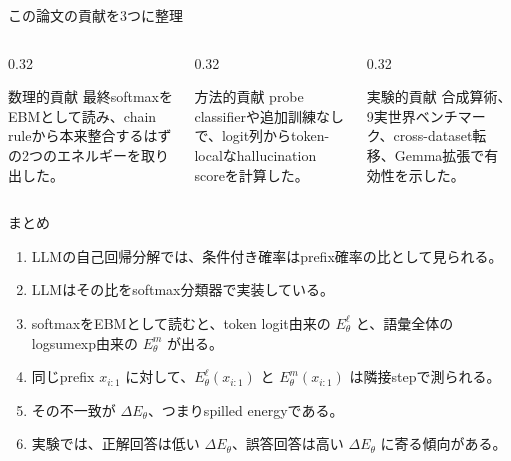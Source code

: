 \documentclass[dvipdfmx,uplatex,unicode,9pt,aspectratio=169]{beamer}
\newcommand{\DeltaE}{\Delta E_{\theta}}
\newcommand{\El}{E^{\ell}_{\theta}}
\newcommand{\Em}{E^{m}_{\theta}}
\begin{document}
\begin{frame}{この論文の貢献を3つに整理}
\begin{columns}[T,onlytextwidth]
\begin{column}{0.32\linewidth}
\begin{block}{数理的貢献}
最終softmaxをEBMとして読み、chain ruleから本来整合するはずの2つのエネルギーを取り出した。
\end{block}
\end{column}
\begin{column}{0.32\linewidth}
\begin{block}{方法的貢献}
probe classifierや追加訓練なしで、logit列からtoken-localなhallucination scoreを計算した。
\end{block}
\end{column}
\begin{column}{0.32\linewidth}
\begin{block}{実験的貢献}
合成算術、9実世界ベンチマーク、cross-dataset転移、Gemma拡張で有効性を示した。
\end{block}
\end{column}
\end{columns}
\vspace{0.9em}
\begin{center}
\end{center}
\end{frame}

\begin{frame}{まとめ}
\begin{enumerate}
\item LLMの自己回帰分解では、条件付き確率はprefix確率の比として見られる。
\item LLMはその比をsoftmax分類器で実装している。
\item softmaxをEBMとして読むと、token logit由来の $\El$ と、語彙全体のlogsumexp由来の $\Em$ が出る。
\item 同じprefix $x_{i:1}$ に対して、$\El(x_{i:1})$ と $\Em(x_{i:1})$ は隣接stepで測られる。
\item その不一致が $\DeltaE$、つまりspilled energyである。
\item 実験では、正解回答は低い $\DeltaE$、誤答回答は高い $\DeltaE$ に寄る傾向がある。
\end{enumerate}
\vspace{0.6em}
\begin{center}
\end{center}
\end{frame}
\end{document}
